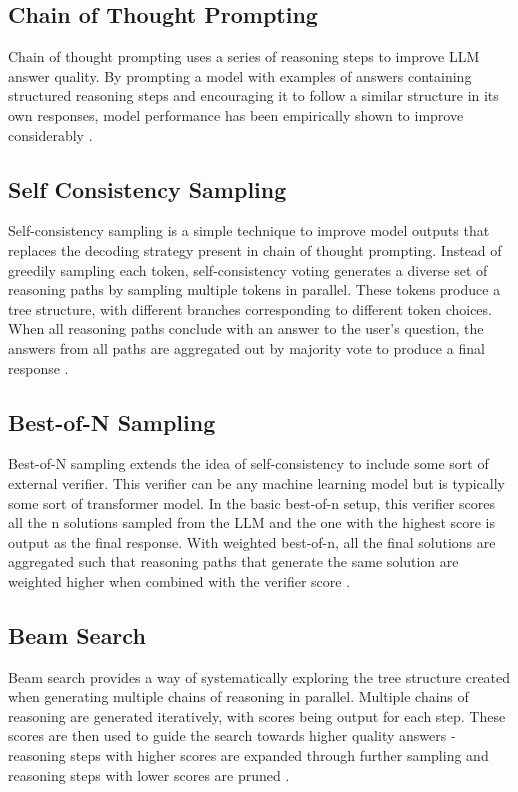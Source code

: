 \documentclass[12pt,twoside]{report}
\begin{document}
\subsection{Chain of Thought Prompting}
Chain of thought prompting uses a series of reasoning steps to improve LLM answer quality.  
By prompting a model with examples of answers containing structured reasoning steps and encouraging it to follow a similar structure in its own responses, model performance has been empirically shown to improve considerably \cite{wei2022chain}.

\subsection{Self Consistency Sampling}
Self-consistency sampling is a simple technique to improve model outputs that replaces the decoding strategy present in chain of thought prompting.
Instead of greedily sampling each token, self-consistency voting generates a diverse set of reasoning paths by sampling multiple tokens in parallel.
These tokens produce a tree structure, with different branches corresponding to different token choices.
When all reasoning paths conclude with an answer to the user's question, the answers from all paths are aggregated out by majority vote to produce a final response \cite{wang2022self}.

\subsection{Best-of-N Sampling}
Best-of-N sampling extends the idea of self-consistency to include some sort of external verifier.
This verifier can be any machine learning model but is typically some sort of transformer model.
In the basic best-of-n setup, this verifier scores all the n solutions sampled from the LLM and the one with the highest score is output as the final response.
With weighted best-of-n, all the final solutions are aggregated such that reasoning paths that generate the same solution are weighted higher when combined with the verifier score \cite{stiennon2020learning}.  

\subsection{Beam Search}
Beam search provides a way of systematically exploring the tree structure created when generating multiple chains of reasoning in parallel. 
Multiple chains of reasoning are generated iteratively, with scores being output for each step.
These scores are then used to guide the search towards higher quality answers - reasoning steps with higher scores are expanded through further sampling and reasoning steps with lower scores are pruned \cite{feng2023alphazero} \cite{yao2023tree}. 
\end{document}
